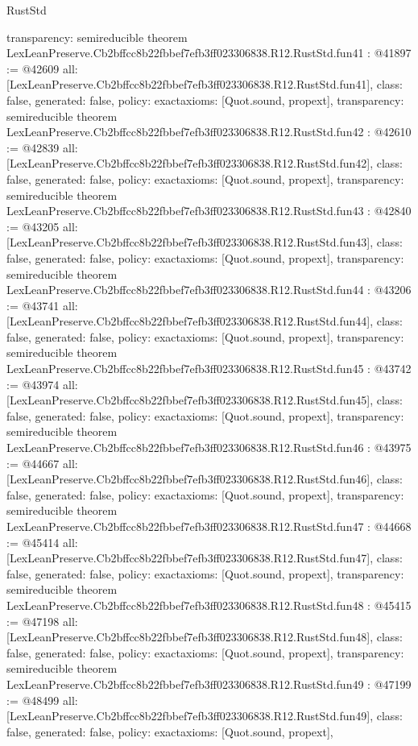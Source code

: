 \begin{lexlean}{RustStd}
\begin{coremodule}
{  transparency: semireducible
}
theorem LexLeanPreserve.Cb2bffcc8b22fbbef7efb3ff023306838.R12.RustStd.fun41 : @41897 := @42609 {
  all: [LexLeanPreserve.Cb2bffcc8b22fbbef7efb3ff023306838.R12.RustStd.fun41],
  class: false,
  generated: false,
  policy: exact{axioms: [Quot.sound, propext]},
  transparency: semireducible
}
theorem LexLeanPreserve.Cb2bffcc8b22fbbef7efb3ff023306838.R12.RustStd.fun42 : @42610 := @42839 {
  all: [LexLeanPreserve.Cb2bffcc8b22fbbef7efb3ff023306838.R12.RustStd.fun42],
  class: false,
  generated: false,
  policy: exact{axioms: [Quot.sound, propext]},
  transparency: semireducible
}
theorem LexLeanPreserve.Cb2bffcc8b22fbbef7efb3ff023306838.R12.RustStd.fun43 : @42840 := @43205 {
  all: [LexLeanPreserve.Cb2bffcc8b22fbbef7efb3ff023306838.R12.RustStd.fun43],
  class: false,
  generated: false,
  policy: exact{axioms: [Quot.sound, propext]},
  transparency: semireducible
}
theorem LexLeanPreserve.Cb2bffcc8b22fbbef7efb3ff023306838.R12.RustStd.fun44 : @43206 := @43741 {
  all: [LexLeanPreserve.Cb2bffcc8b22fbbef7efb3ff023306838.R12.RustStd.fun44],
  class: false,
  generated: false,
  policy: exact{axioms: [Quot.sound, propext]},
  transparency: semireducible
}
theorem LexLeanPreserve.Cb2bffcc8b22fbbef7efb3ff023306838.R12.RustStd.fun45 : @43742 := @43974 {
  all: [LexLeanPreserve.Cb2bffcc8b22fbbef7efb3ff023306838.R12.RustStd.fun45],
  class: false,
  generated: false,
  policy: exact{axioms: [Quot.sound, propext]},
  transparency: semireducible
}
theorem LexLeanPreserve.Cb2bffcc8b22fbbef7efb3ff023306838.R12.RustStd.fun46 : @43975 := @44667 {
  all: [LexLeanPreserve.Cb2bffcc8b22fbbef7efb3ff023306838.R12.RustStd.fun46],
  class: false,
  generated: false,
  policy: exact{axioms: [Quot.sound, propext]},
  transparency: semireducible
}
theorem LexLeanPreserve.Cb2bffcc8b22fbbef7efb3ff023306838.R12.RustStd.fun47 : @44668 := @45414 {
  all: [LexLeanPreserve.Cb2bffcc8b22fbbef7efb3ff023306838.R12.RustStd.fun47],
  class: false,
  generated: false,
  policy: exact{axioms: [Quot.sound, propext]},
  transparency: semireducible
}
theorem LexLeanPreserve.Cb2bffcc8b22fbbef7efb3ff023306838.R12.RustStd.fun48 : @45415 := @47198 {
  all: [LexLeanPreserve.Cb2bffcc8b22fbbef7efb3ff023306838.R12.RustStd.fun48],
  class: false,
  generated: false,
  policy: exact{axioms: [Quot.sound, propext]},
  transparency: semireducible
}
theorem LexLeanPreserve.Cb2bffcc8b22fbbef7efb3ff023306838.R12.RustStd.fun49 : @47199 := @48499 {
  all: [LexLeanPreserve.Cb2bffcc8b22fbbef7efb3ff023306838.R12.RustStd.fun49],
  class: false,
  generated: false,
  policy: exact{axioms: [Quot.sound, propext]},
}
\end{coremodule}
\end{lexlean}
